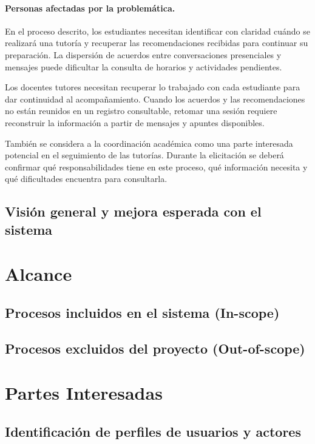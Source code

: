 \documentclass[11pt, a4paper]{article}
\begin{document}
\paragraph{Personas afectadas por la problemática.}

En el proceso descrito, los estudiantes necesitan identificar con
claridad cuándo se realizará una tutoría y recuperar las recomendaciones
recibidas para continuar su preparación. La dispersión de acuerdos
entre conversaciones presenciales y mensajes puede dificultar la
consulta de horarios y actividades pendientes.

Los docentes tutores necesitan recuperar lo trabajado con cada
estudiante para dar continuidad al acompañamiento. Cuando los acuerdos
y las recomendaciones no están reunidos en un registro consultable,
retomar una sesión requiere reconstruir la información a partir de
mensajes y apuntes disponibles.

También se considera a la coordinación académica como una parte
interesada potencial en el seguimiento de las tutorías. Durante la
elicitación se deberá confirmar qué responsabilidades tiene en este
proceso, qué información necesita y qué dificultades encuentra para
consultarla.

\subsection{Visión general y mejora esperada con el sistema}


\section{Alcance}
\subsection{Procesos incluidos en el sistema (In-scope)}
\subsection{Procesos excluidos del proyecto (Out-of-scope)}

\section{Partes Interesadas}
\subsection{Identificación de perfiles de usuarios y actores}
\end{document}
